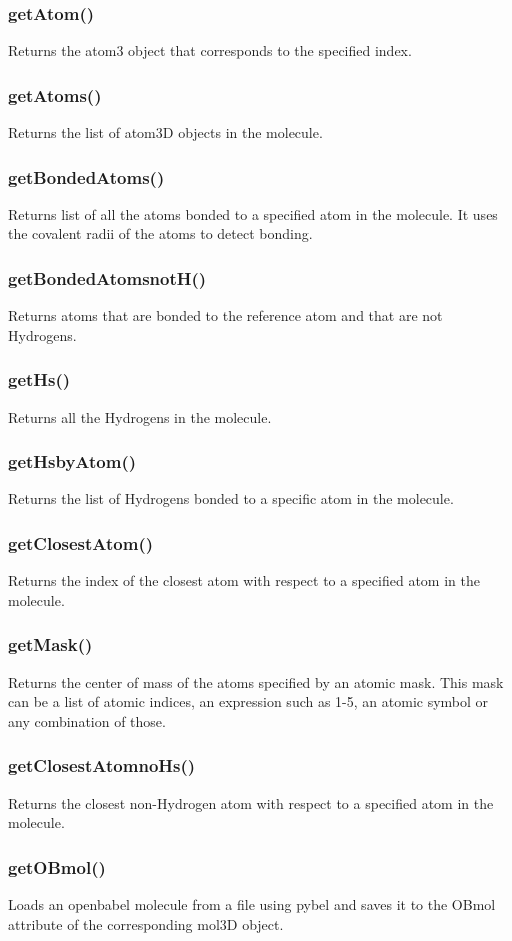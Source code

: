 \documentclass[a4paper,12pt]{assignment}
\begin{document}
\subsubsection{getAtom()}
Returns the atom3 object that corresponds to the specified index.
\subsubsection{getAtoms()}
Returns the list of atom3D objects in the molecule.
\subsubsection{getBondedAtoms()}
Returns list of all the atoms bonded to a specified atom in the molecule. It uses the covalent radii of the atoms to detect bonding.
\subsubsection{getBondedAtomsnotH()}
Returns atoms that are bonded to the reference atom and that are not Hydrogens.
\subsubsection{getHs()}
Returns all the Hydrogens in the molecule.
\subsubsection{getHsbyAtom()}
Returns the list of Hydrogens bonded to a specific atom in the molecule.
\subsubsection{getClosestAtom()}
Returns the index of the closest atom with respect to a specified atom in the molecule.
\subsubsection{getMask()}
Returns the center of mass of the atoms specified by an atomic mask. This mask can be a list of atomic indices, an expression such as 1-5, an atomic symbol or any combination of those.
\subsubsection{getClosestAtomnoHs()}
Returns the closest non-Hydrogen atom with respect to a specified atom in the molecule.
\subsubsection{getOBmol()}
Loads an openbabel molecule from a file using pybel and saves it to the OBmol attribute of the corresponding mol3D object.
\end{document}
